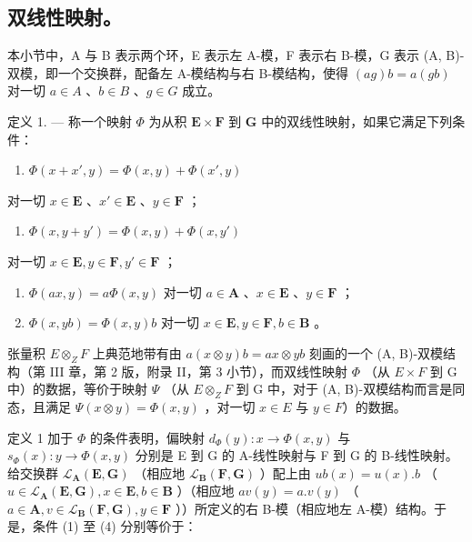 \subsection{双线性映射。}

本小节中，A 与 B 表示两个环，E 表示左 A-模，F 表示右 B-模，G 表示 (A, B)-双模，即一个交换群，配备左 A-模结构与右 B-模结构，使得 \((ag)b = a(gb)\) 对一切 \(a \in A\) 、\(b \in B\) 、\(g \in G\) 成立。

定义 1. --- 称一个映射 \(\Phi\) 为从积 \(\mathbf{E} \times \mathbf{F}\) 到 \(\mathbf{G}\) 中的双线性映射，如果它满足下列条件：

\begin{enumerate}
\def\labelenumi{(\arabic{enumi})}
\tightlist
\item
  \(\Phi(x + x', y) = \Phi(x, y) + \Phi(x', y)\)
\end{enumerate}

对一切 \(x \in \mathbf{E}\) 、\(x' \in \mathbf{E}\) 、\(y \in \mathbf{F}\) ；

\begin{enumerate}
\def\labelenumi{(\arabic{enumi})}
\setcounter{enumi}{1}
\tightlist
\item
  \(\Phi(x, y + y') = \Phi(x, y) + \Phi(x, y')\)
\end{enumerate}

对一切 \(x \in \mathbf{E}, y \in \mathbf{F}, y' \in \mathbf{F}\) ；

\begin{enumerate}
\def\labelenumi{(\arabic{enumi})}
\setcounter{enumi}{2}
\item
  \(\Phi(ax, y) = a\Phi(x, y)\) 对一切 \(a \in \mathbf{A}\) 、\(x \in \mathbf{E}\) 、\(y \in \mathbf{F}\) ；
\item
  \(\Phi(x, yb) = \Phi(x, y)b\) 对一切 \(x \in \mathbf{E}, y \in \mathbf{F}, b \in \mathbf{B}\) 。
\end{enumerate}

张量积 \(E \otimes_{Z} F\) 上典范地带有由 \(a(x \otimes y)b = ax \otimes yb\) 刻画的一个 (A, B)-双模结构（第 III 章，第 2 版，附录 II，第 3 小节），而双线性映射 \(\Phi\) （从 \(E \times F\) 到 G 中）的数据，等价于映射 \(\Psi\) （从 \(E \otimes_{Z} F\) 到 G 中，对于 (A, B)-双模结构而言是同态，且满足 \(\Psi(x \otimes y) = \Phi(x, y)\) ，对一切 \(x \in E\) 与 \(y \in F\)）的数据。

定义 1 加于 \(\Phi\) 的条件表明，偏映射 \(d_{\Phi}(y): x \to \Phi(x, y)\) 与 \(s_{\Phi}(x): y \to \Phi(x, y)\) 分别是 E 到 G 的 A-线性映射与 F 到 G 的 B-线性映射。给交换群 \(\mathcal{L}_{\mathbf{A}}(\mathbf{E}, \mathbf{G})\) （相应地 \(\mathcal{L}_{\mathbf{B}}(\mathbf{F}, \mathbf{G})\) ）配上由 \(ub(x) = u(x). b\) （ \(u \in \mathcal{L}_{\mathbf{A}}(\mathbf{E}, \mathbf{G}), x \in \mathbf{E}, b \in \mathbf{B}\) ）（相应地 \(av(y) = a. v(y)\) （ \(a \in \mathbf{A}, v \in \mathcal{L}_{\mathbf{B}}(\mathbf{F}, \mathbf{G}), y \in \mathbf{F}\) ））所定义的右 B-模（相应地左 A-模）结构。于是，条件 (1) 至 (4) 分别等价于：

